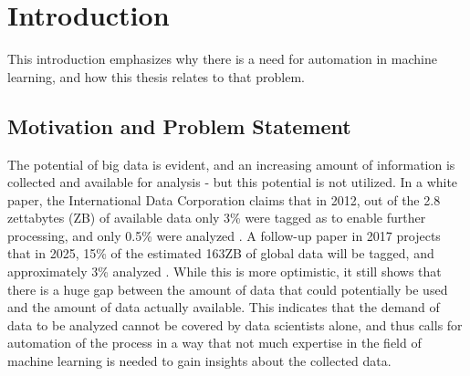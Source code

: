 %
\chapter{Introduction}
\label{sec:intro}
This introduction emphasizes why there is a need for automation in machine learning, and how this thesis relates to that problem. 

\section{Motivation and Problem Statement}
\label{sec:intro:motivation}
The potential of big data is evident, and an increasing amount of information is collected and available for analysis - but this potential is not utilized. In a white paper, the International Data Corporation claims that in 2012, out of the 2.8 zettabytes (ZB) of available data only 3\% were tagged as to enable further processing, and only 0.5\% were analyzed \cite{gantz2012the}. A follow-up paper in 2017 projects that in 2025, 15\% of the estimated 163ZB of global data will be tagged, and approximately 3\% analyzed \cite{gantz2017data}. While this is more optimistic, it still shows that there is a huge gap between the amount of data that could potentially be used and the amount of data actually available. This indicates that the demand of data to be analyzed cannot be covered by data scientists alone, and thus calls for automation of the process in a way that not much expertise in the field of machine learning is needed to gain insights about the collected data.


